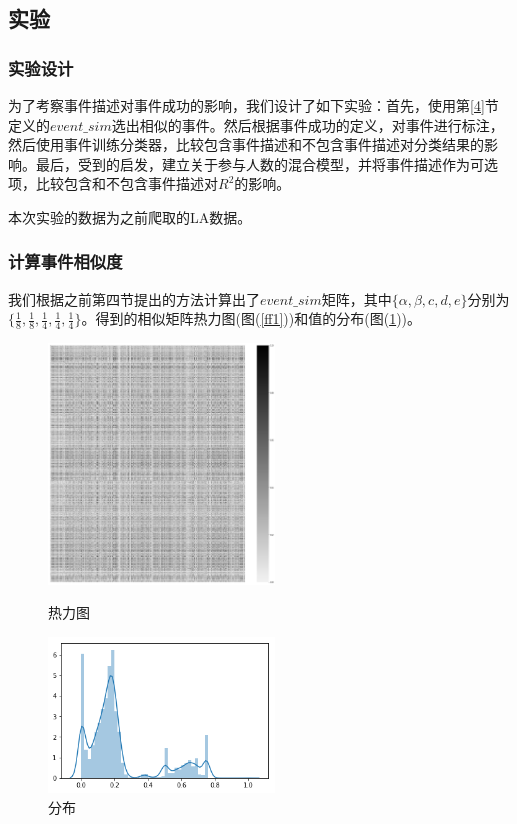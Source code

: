 \subsection{实验}

\subsubsection{实验设计}
为了考察事件描述对事件成功的影响，我们设计了如下实验：首先，使用第\ref{4}节定义的\(event\_sim\)选出相似的事件。然后根据事件成功的定义，对事件进行标注，然后使用事件训练分类器，比较包含事件描述和不包含事件描述对分类结果的影响。最后，受到\cite{noauthor_predicting_nodate}的启发，建立关于参与人数的混合模型，并将事件描述作为可选项，比较包含和不包含事件描述对\(R^2\)的影响。

本次实验的数据为之前爬取的LA数据。

\subsubsection{计算事件相似度}
我们根据之前第四节提出的方法计算出了\(event\_sim\)矩阵，其中\(\{\alpha,\beta,{c},{d},{e}\}\)分别为\(\{\frac{1}{8},\frac{1}{8},\frac{1}{4},\frac{1}{4},\frac{1}{4}\}\)。得到的相似矩阵热力图(图(\ref{ff1}))和值的分布(图(\ref{ff2}))。

\begin{figure}[htbp]
  \centering
  \begin{minipage}[t]{0.48\textwidth}
  \centering
  \includegraphics[width=6cm]{event_sim.png}
  \caption{热力图}
  \label{ff1}
  \end{minipage}
  \begin{minipage}[t]{0.48\textwidth}
  \centering
  \includegraphics[width=6cm]{event_sim_dist.png}
  \caption{分布}
  \label{ff2}
  \end{minipage}
\end{figure}

